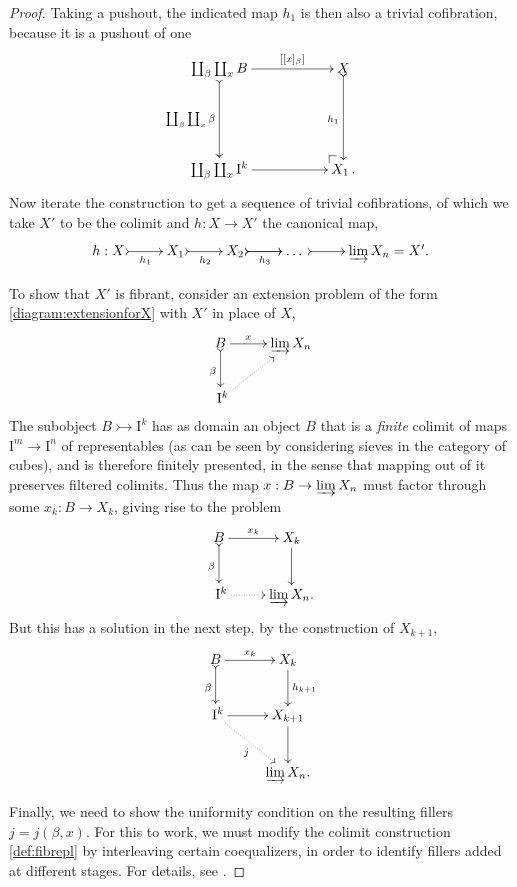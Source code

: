 \documentclass[12pt]{article}
\makeatletter
\newcommand{\pocorner}[1][dr]{\save*!/#1+1.2pc/#1:(1,-1)@^{|-}\restore}
\newcommand{\mono}{\ensuremath{\rightarrowtail}}
\newcommand{\ra}{\ensuremath{\rightarrow}}
\newcommand{\I}{\ensuremath{\mathrm{I}}}
\theoremstyle{remark}
\theoremstyle{definition}
\makeatother
\begin{document}
\begin{proof}
Taking a pushout, the indicated map $h_1$ is then also a trivial cofibration, because it is a pushout of one
\begin{equation*}%
\xymatrix{
{\coprod_{\beta}\coprod_{x} B} \ar@{>->}[dd]_-{\coprod_{\beta}\coprod_{x}\beta} {\ar[rr]^-{[[x]_\beta]}} && X \ar@{>->}[dd]_{h_1}\\
&&\\
{\coprod_{\beta}\coprod_{x} \I^{k}} \ar[rr] && {\pocorner} X_1\,.
}
\end{equation*}
Now iterate the construction to get a sequence of trivial cofibrations, of which we take $X'$ to be the colimit and $h :X\ra X'$ the canonical map,
\begin{equation}\label{def:fibrepl}
\xymatrix{
h:X \ar@{>->}[r]_-{h_1} & X_1 \ar@{>->}[r]_-{h_2} & X_2 \ar@{>->}[r]_-{h_3} \ar@{>->}[r] & \dots\ \ar@{>->}[r] & {\varinjlim X_n} = X'.
}
\end{equation}

To show that $X'$ is fibrant, consider an extension problem of the form \eqref{diagram:extensionforX} with $X'$ in place of $X$,
\begin{equation*}%
\xymatrix{
B \ar@{>->}[d]_{\beta} \ar[r]^-x & {\varinjlim X_n}\\
\ \I^{k} \ar@{..>}[ru]&
}
\end{equation*}
The subobject $B\mono \I^k$ has as domain an object $B$ that is a \emph{finite} colimit of maps $\I^m \ra \I^n$ of representables (as can be seen by considering sieves in the category of cubes), and is therefore finitely presented, in the sense that mapping out of it preserves filtered colimits.  Thus the map $x: B \ra {\varinjlim X_n}$ must factor through some $x_k: B \ra X_k$, giving rise to the problem
\begin{equation*}%
\xymatrix{
B \ar@{>->}[d]_{\beta} \ar[r]^-{x_k}  & X_k \ar[d] \\
\ \I^{k} \ar@{..>}[r] &  {\varinjlim X_n}.
}
\end{equation*}
But this has a solution in the next step, by the construction of $X_{k+1}$,
\begin{equation*}%
\xymatrix{
B \ar@{>->}[d]_{\beta} \ar[r]^-{x_k} & X_k \ar[d]^{h_{k+1}} \\
\ \I^{k} \ar[r]  \ar@{..>}[rd]_j &  X_{k+1}\ar[d]\\
& {\varinjlim X_n}.
}
\end{equation*}

Finally, we need to show the uniformity condition on the resulting fillers $j = j(\beta,x)$.  For this to work, we must modify the colimit construction \eqref{def:fibrepl} by interleaving certain coequalizers, in order to identify fillers added at different stages.  For details, see \cite{Garner, Awodey}.
\end{proof}
\end{document}
